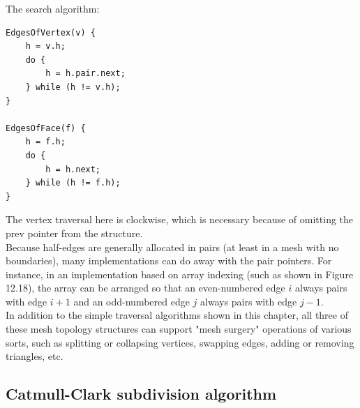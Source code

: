 \documentclass[11pt]{article}
\numberwithin{equation}{section}
\begin{document}
The search algorithm:
\begin{framed}
\begin{verbatim}
EdgesOfVertex(v) { 
	h = v.h;
	do {
		h = h.pair.next;
	} while (h != v.h); 
}

EdgesOfFace(f) { 
	h = f.h;
	do {
		h = h.next;
	} while (h != f.h); 
}
\end{verbatim}
\end{framed}

The vertex traversal here is clockwise, which is necessary because of omitting the prev pointer from the structure.\\
Because half-edges are generally allocated in pairs (at least in a mesh with no boundaries), many implementations can do away with the pair pointers. For instance, in an implementation based on array indexing (such as shown in Figure 12.18), the array can be arranged so that an even-numbered edge $i$ always pairs with edge $i + 1$ and an odd-numbered edge $j$ always pairs with edge $j-1$.\\
In addition to the simple traversal algorithms shown in this chapter, all three of these mesh topology structures can support "mesh surgery" operations of various sorts, such as splitting or collapsing vertices, swapping edges, adding or removing triangles, etc.

\subsection{Catmull-Clark subdivision algorithm}
\end{document}
